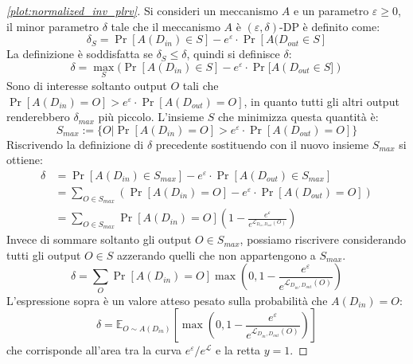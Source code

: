 \begin{proof}[\ref{plot:normalized_inv_plrv}]
\label{proof:plrv_gaussian}
Si consideri un meccanismo $A$ e un parametro $\varepsilon \ge 0$, il minor parametro $\delta$ tale che il meccanismo $A$ è $(\varepsilon, \delta)$-DP è definito come:
\begin{equation*}
    \delta_S = \Pr[A(D_{in}) \in S] - e^\varepsilon \cdot \Pr[A(D_{out} \in S]
\end{equation*}
La definizione è soddisfatta se $\delta_S \le \delta$, quindi si definisce $\delta$:
\begin{equation*}
    \delta = \max_S(\Pr[A(D_{in}) \in S] - e^\varepsilon \cdot \Pr[A(D_{out} \in S])
\end{equation*}
Sono di interesse soltanto output $O$ tali che $\Pr[A(D_{in}) = O] > e^\varepsilon \cdot \Pr[A(D_{out}) = O]$, in quanto tutti gli altri output renderebbero $\delta_{max}$ più piccolo. L'insieme $S$ che minimizza questa quantità è:
\begin{equation*}
    S_{max} := \{O | \Pr[A(D_{in}) = O] > e^\varepsilon \cdot \Pr[A(D_{out}) = O]\}
\end{equation*}
Riscrivendo la definizione di $\delta$ precedente sostituendo con il nuovo insieme $S_{max}$ si ottiene:
\begin{align*}
    \delta &= \Pr[A(D_{in}) \in S_{max}] - e^\varepsilon \cdot \Pr[A(D_{out}) \in S_{max}]\\
    &= \sum_{O \in S_{max}} (\Pr[A(D_{in}) = O] - e^\varepsilon \cdot \Pr[A(D_{out}) = O])\\
    &= \sum_{O \in S_{max}} \Pr[A(D_{in}) = O]\left(1 - \frac{e^\varepsilon}{e^{\mathcal{L}_{D_{in},D_{out}}(O)}}\right)
\end{align*}
Invece di sommare soltanto gli output $O \in S_{max}$, possiamo riscrivere considerando tutti gli output $O \in S$ azzerando quelli che non appartengono a $S_{max}$.
\begin{equation*}
    \delta = \sum_O \Pr[A(D_{in}) = O] \max\left(0, 1 - \frac{e^\varepsilon}{e^{\mathcal{L}_{D_{in},D_{out}}(O)}}\right)
\end{equation*}
L'espressione sopra è un valore atteso pesato sulla probabilità che $A(D_{in}) = O$:
\begin{equation*}
\delta = \mathbb{E}_{O\sim A(D_{in})} \left[ \max\left(0, 1 - \frac{e^\varepsilon}{e^{\mathcal{L}_{D_{in},D_{out}}(O)}}\right)\right]
\end{equation*}
che corrisponde all'area tra la curva $e^{\mathcal{\varepsilon}}/e^{\mathcal{L}}$ e la retta $y = 1$.
\end{proof}